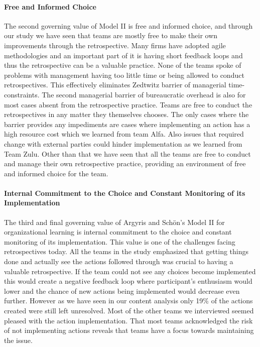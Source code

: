 \paragraph{Free and Informed Choice}
The second governing value of Model II is free and informed choice, and through our study we have seen that teams are mostly free to make their own improvements through the retrospective. Many firms have adopted agile methodologies and an important part of it is having short feedback loops and thus the retrospective can be a valuable practice. None of the teams spoke of problems with management having too little time or being allowed to conduct retrospectives. This effectively eliminates Zedtwitz\cite{Zedtwitz2002} barrier of managerial time-constraints. The second managerial barrier of bureaucratic overhead is also for most cases absent from the retrospective practice. Teams are free to conduct the retrospectives in any matter they themselves chooses. The only cases where the barrier provides any impediments are cases where implementing an action has a high resource cost which we learned from team Alfa. Also issues that required change with external parties could hinder implementation as we learned from Team Zulu. Other than that we have seen that all the teams are free to conduct and manage their own retrospective practice, providing an environment of free and informed choice for the team. 

\paragraph{Internal Commitment to the Choice and Constant Monitoring of its Implementation}
The third and final governing value of Argyris and Schön's Model II for organizational learning is internal commitment to the choice and constant monitoring of its implementation. This value is one of the challenges facing retrospectives today. All the teams in the study emphasized that getting things done and actually see the actions followed through was crucial to having a valuable retrospective. If the team could not see any choices become implemented this would create a negative feedback loop where participant's enthusiasm would lower and the chance of new actions being implemented would decrease even further. However as we have seen in our content analysis only 19\% of the actions created were still left unresolved. Most of the other teams we interviewed seemed pleased with the action implementation. That most teams acknowledged the risk of not implementing actions reveals that teams have a focus towards maintaining the issue. 

